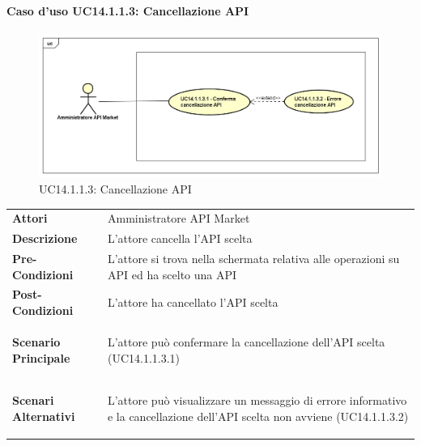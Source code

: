 \newpage
\paragraph{Caso d'uso UC14.1.1.3: Cancellazione API}
\label{UC14_1_1_3}
\begin{figure}[ht]
	\centering
	\includegraphics[scale=0.45]{UML/UC14_1_1_3.png}
	\caption{UC14.1.1.3: Cancellazione API}
\end{figure}

\begin{minipage}{\linewidth}
	\begin{tabular}{ l | p{11cm}}
		\hline
		\rowcolor{Gray}
		\multicolumn{2}{c}{UC14.1.1.3 - Cancellazione API} \\
		\hline
		\textbf{Attori} & Amministratore API Market \\
		\textbf{Descrizione} & L'attore cancella l'API scelta \\
		\textbf{Pre-Condizioni} & L'attore si trova nella schermata relativa alle operazioni su API ed ha scelto una API \\
		\textbf{Post-Condizioni} & L'attore ha cancellato l'API scelta \\
		\textbf{Scenario Principale} & 
		\begin{enumerate*}[label=(\arabic*.),itemjoin={\newline}]
			\item L'attore può confermare la cancellazione dell'API scelta (UC14.1.1.3.1)
		\end{enumerate*}\\
		\textbf{Scenari Alternativi} & 
		\begin{enumerate*}[label=(\arabic*.),itemjoin={\newline}]
			\item L'attore può visualizzare un messaggio di errore informativo e la cancellazione dell'API scelta non avviene (UC14.1.1.3.2)
		\end{enumerate*}\\
	\end{tabular}
\end{minipage}

